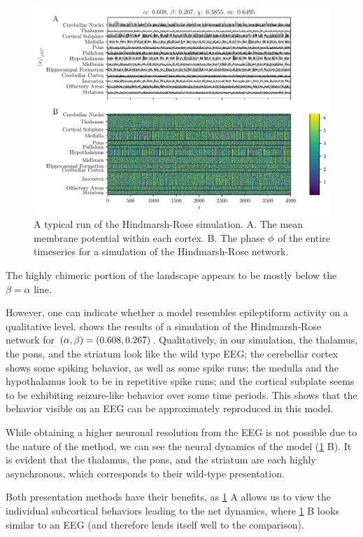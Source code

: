 \begin{figure}[ht]
  \centering
  \includegraphics[width=\textwidth]{figure/0_608-0_267_200dpi.pdf}
  \caption[Typical simulation]{A typical run of the Hindmarsh-Rose simulation.
    A. The mean membrane potential within each cortex.
    B. The phase $\phi$ of the entire timeseries for a simulation of the Hindmarsh-Rose network.
  }
  \label{fig:608_267}
\end{figure}

The highly chimeric portion of the landscape appears to be mostly below the $\beta = \alpha$ line.

However, one can indicate whether a model resembles epileptiform activity on a qualitative level.
 shows the results of a simulation of the Hindmarsh-Rose network for $\pqty{\hra, \hrb} = \pqty{0.608, 0.267}$.
Qualitatively, in our simulation,
the thalamus, the pons, and the striatum look like the wild type EEG;
the cerebellar cortex shows some spiking behavior,
as well as some spike runs;
the medulla and the hypothalamus look to be in repetitive spike runs;
and the cortical subplate seems to be exhibiting seizure-like behavior over some time periods.
This shows that the behavior visible on an EEG can be approximately reproduced in this model.

While obtaining a higher neuronal resolution from the EEG is not possible due to the nature of the method,
we can see the neural dynamics of the model (\cref{fig:608_267} B).
It is evident that the thalamus, the pons, and the striatum are each highly asynchronous, which corresponds to their wild-type presentation.

Both presentation methods have their benefits, as \cref{fig:608_267} A allows us to view the individual subcortical behaviors leading to the net dynamics, where \cref{fig:608_267} B looks similar to an EEG (and therefore lends itself well to the comparison).
